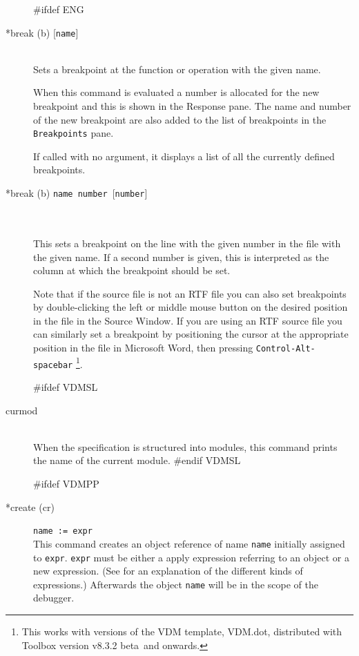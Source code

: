 \documentclass[\pformat,12pt]{article}
\newcommand{\vdmtoolsver}{v8.3.2 beta}
\newcommand{\vdmtoolsver}{v8.3.2}
\newcommand{\guicmd}[1]{{\sf #1}}
\newcommand{\guicmd}[1]{{\gt #1}}
\begin{document}
\begin{description}

#ifdef ENG
\item[*break (b) \mbox{[{\tt name}]}] 
\mbox{}\\
  Sets a breakpoint at the function or
  operation with the given name.

  When this command is evaluated a number is allocated for the new 
  breakpoint and this is shown in the \guicmd{Response} pane. The name
  and number of the new breakpoint are also added to the list of
  breakpoints in the \texttt{Breakpoints} pane.

  If called with no argument, it displays a list of all the currently 
  defined breakpoints.

\item[*break (b) \mbox{\texttt{name number} [\texttt{number}]}]\mbox{}\\
\mbox{}\\
 This sets a breakpoint on the line with the given number in the file
 with the given name. If a second number is given, this is 
 interpreted as the column at which the breakpoint should be set.

Note that if the source file is not an RTF file you can also set
breakpoints by double-clicking the left or middle mouse button on the
desired position in the file in the \guicmd{Source Window}. If you are
using an RTF source file you can similarly set a breakpoint by
positioning the cursor at the appropriate position in the file in
Microsoft Word, then pressing
\texttt{Control-Alt-spacebar}%
  \footnote{This works with versions of the VDM template,
  VDM.dot, 
  distributed with Toolbox version \vdmtoolsver\
  and onwards.}.

#ifdef VDMSL
\item[curmod] \mbox{}\\
  When the specification is structured into modules, this command
  prints the name of the current module.
#endif VDMSL

#ifdef VDMPP
\item[*create (cr)] {\tt name := expr}\mbox{}\\
  This command creates an object reference of name {\tt name}
  initially assigned to {\tt expr}.  {\tt expr} must be either a
  apply expression referring to an object or a new expression. (See
  \cite{LangManPP-SCSK} for an explanation of the different kinds of
  expressions.)  Afterwards the object {\tt name} will be in the scope
  of the debugger.
  

\end{description}
\end{document}
